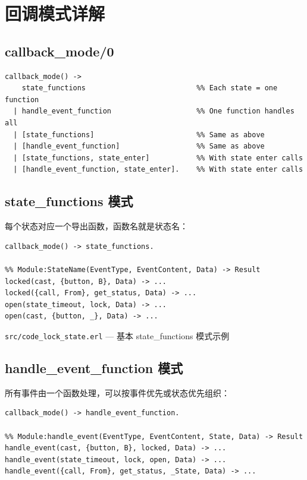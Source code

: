\documentclass[a4paper,11pt]{article}
\begin{document}
\section{回调模式详解}

\subsection{callback\_mode/0}

\begin{lstlisting}[style=erlangstyle]
callback_mode() ->
    state_functions                          %% Each state = one function
  | handle_event_function                    %% One function handles all
  | [state_functions]                        %% Same as above
  | [handle_event_function]                  %% Same as above
  | [state_functions, state_enter]           %% With state enter calls
  | [handle_event_function, state_enter].    %% With state enter calls
\end{lstlisting}

\subsection{state\_functions 模式}

每个状态对应一个导出函数，函数名就是状态名：

\begin{lstlisting}[style=erlangstyle]
callback_mode() -> state_functions.

%% Module:StateName(EventType, EventContent, Data) -> Result
locked(cast, {button, B}, Data) -> ...
locked({call, From}, get_status, Data) -> ...
open(state_timeout, lock, Data) -> ...
open(cast, {button, _}, Data) -> ...
\end{lstlisting}

\begin{notebox}[源码文件]
\texttt{src/code\_lock\_state.erl} --- 基本 state\_functions 模式示例
\end{notebox}

\subsection{handle\_event\_function 模式}

所有事件由一个函数处理，可以按事件优先或状态优先组织：

\begin{lstlisting}[style=erlangstyle]
callback_mode() -> handle_event_function.

%% Module:handle_event(EventType, EventContent, State, Data) -> Result
handle_event(cast, {button, B}, locked, Data) -> ...
handle_event(state_timeout, lock, open, Data) -> ...
handle_event({call, From}, get_status, _State, Data) -> ...
\end{lstlisting}
\end{document}
